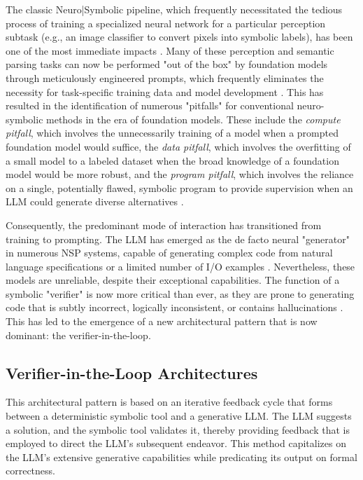 \documentclass[12pt, a4paper]{report}
\begin{document}
The classic Neuro|Symbolic pipeline, which frequently necessitated the tedious process of training a specialized neural network for a particular perception subtask (e.g., an image classifier to convert pixels into symbolic labels), has been one of the most immediate impacts \citep{cranmer2020interpretable}. Many of these perception and semantic parsing tasks can now be performed "out of the box" by foundation models through meticulously engineered prompts, which frequently eliminates the necessity for task-specific training data and model development \citep{cranmer2020interpretable}. This has resulted in the identification of numerous "pitfalls" for conventional neuro-symbolic methods in the era of foundation models. These include the \textit{compute pitfall}, which involves the unnecessarily training of a model when a prompted foundation model would suffice, the \textit{data pitfall}, which involves the overfitting of a small model to a labeled dataset when the broad knowledge of a foundation model would be more robust, and the \textit{program pitfall}, which involves the reliance on a single, potentially flawed, symbolic program to provide supervision when an LLM could generate diverse alternatives \citep{cranmer2020interpretable}.

Consequently, the predominant mode of interaction has transitioned from training to prompting. The LLM has emerged as the de facto neural "generator" in numerous NSP systems, capable of generating complex code from natural language specifications or a limited number of I/O examples \citep{solarlezama2005combinatorial}. Nevertheless, these models are unreliable, despite their exceptional capabilities. The function of a symbolic "verifier" is now more critical than ever, as they are prone to generating code that is subtly incorrect, logically inconsistent, or contains hallucinations \citep{shiqi2019neuro}. This has led to the emergence of a new architectural pattern that is now dominant: the verifier-in-the-loop.

\subsection{Verifier-in-the-Loop Architectures}
This architectural pattern is based on an iterative feedback cycle that forms between a deterministic symbolic tool and a generative LLM. The LLM suggests a solution, and the symbolic tool validates it, thereby providing feedback that is employed to direct the LLM's subsequent endeavor. This method capitalizes on the LLM's extensive generative capabilities while predicating its output on formal correctness.
\end{document}
